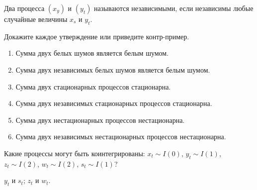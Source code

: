 \begin{problem}
Два процесса $(x_y)$ и $(y_t)$ называются независимыми, если независимы любые случайные величины $x_s$ и $y_t$.

Докажите каждое утверждение или приведите контр-пример.
\begin{enumerate}
  \item Сумма двух белых шумов является белым шумом.
  \item Сумма двух независимых белых шумов является белым шумом.
  \item Сумма двух стационарных процессов стационарна.
  \item Сумма двух независимых стационарных процессов стационарна.
  \item Сумма двух нестационарных процессов нестационарна.
  \item Сумма двух независимых нестационарных процессов нестационарна.
\end{enumerate}

\begin{sol}

\end{sol}
\end{problem}

\begin{problem}
Какие процессы могут быть коинтегрированы: $x_t \sim I(0)$, $y_t \sim I(1)$, $z_t \sim I(2)$, $w_t \sim I(2)$, $s_t \sim I(1)$?

\begin{sol}
$y_t$ и $s_t$; $z_t$ и $w_t$.
\end{sol}

\end{problem}

